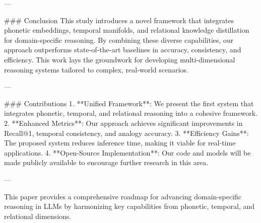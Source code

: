 ---

### Conclusion  
This study introduces a novel framework that integrates phonetic embeddings, temporal manifolds, and relational knowledge distillation for domain-specific reasoning. By combining these diverse capabilities, our approach outperforms state-of-the-art baselines in accuracy, consistency, and efficiency. This work lays the groundwork for developing multi-dimensional reasoning systems tailored to complex, real-world scenarios.

---

### Contributions  
1. **Unified Framework**: We present the first system that integrates phonetic, temporal, and relational reasoning into a cohesive framework.  
2. **Enhanced Metrics**: Our approach achieves significant improvements in Recall@1, temporal consistency, and analogy accuracy.  
3. **Efficiency Gains**: The proposed system reduces inference time, making it viable for real-time applications.  
4. **Open-Source Implementation**: Our code and models will be made publicly available to encourage further research in this area.  

--- 

This paper provides a comprehensive roadmap for advancing domain-specific reasoning in LLMs by harmonizing key capabilities from phonetic, temporal, and relational dimensions.